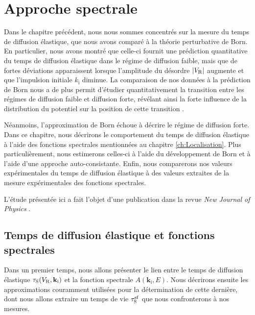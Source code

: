 

\chapter{Approche spectrale}
\label{ch:TauS_NJP}

Dans le chapitre précédent, nous nous sommes concentrés sur la mesure du temps de diffusion élastique, que nous avons comparé à la théorie perturbative de Born. En particulier, nous avons montré que celle-ci fournit une prédiction quantitative du temps de diffusion élastique dans le régime de diffusion faible, mais que de fortes déviations apparaissent lorsque l'amplitude du désordre $|V_{\mathrm{R}}|$ augmente et que l'impulsion initiale $k_{\mathrm{i}}$ diminue. La comparaison de nos données à la prédiction de Born nous a de plus permit d'étudier quantitativement la transition entre les régimes de diffusion faible et diffusion forte, révélant ainsi la forte influence de la distribution du potentiel sur la position de cette transition \citep{richard2019elastic}. 

Néanmoins, l'approximation de Born échoue à décrire le régime de diffusion forte. Dans ce chapitre, nous décrirons le comportement du temps de diffusion élastique à l'aide des fonctions spectrales mentionnées au chapitre \ref{ch:Localisation}. Plus particulièrement, nous estimerons celles-ci à l'aide du développement de Born et à l'aide d'une approche auto-consistante. Enfin, nous comparerons nos valeurs expérimentales du temps de diffusion élastique à des valeurs extraites de la mesure expérimentales des fonctions spectrales.

L'étude présentée ici a fait l'objet d'une publication dans la revue \emph{New Journal of Physics} \citep{signoles2019ultracold}.

\section{Temps de diffusion élastique et fonctions spectrales}

Dans un premier temps, nous allons présenter le lien entre le temps de diffusion élastique $\tau_{\mathrm{S}}(V_{\mathrm{R}},\mathbf{k}_{\mathrm{i}})$ et la fonction spectrale $A(\mathbf{k}_{\mathrm{i}},E)$. Nous décrirons ensuite les approximations couramment utilisées pour la détermination de cette dernière, dont nous allons extraire un temps de vie $\tau_{\mathrm{S}}^{\mathrm{sf}}$ que nous confronterons à nos mesures. 


